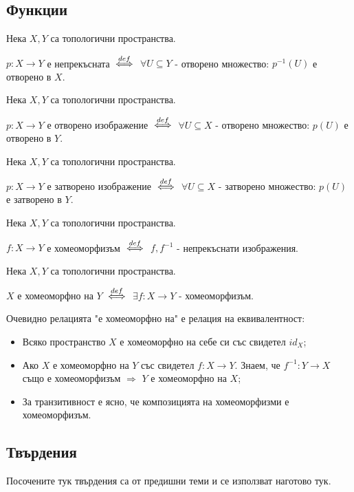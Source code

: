 \subsection{Функции}
\begin{definition}
    Нека $X, Y$ са топологични пространства.
    
    $p: X \to Y$ е непрекъсната ${\overset{def}{\iff}}$ $\forall U \subseteq Y$ - отворено множество: $p^{-1}(U)$ е отворено в $X$.
\end{definition}
\begin{definition}
    Нека $X, Y$ са топологични пространства.
    
    $p: X \to Y$ е отворено изображение ${\overset{def}{\iff}}$ $\forall U \subseteq X$ - отворено множество: $p(U)$ е отворено в $Y$.
\end{definition}
\begin{definition}
    Нека $X, Y$ са топологични пространства.
    
    $p: X \to Y$ е затворено изображение ${\overset{def}{\iff}}$ $\forall U \subseteq X$ - затворено множество: $p(U)$ е затворено в $Y$.
\end{definition}
\begin{definition}
    Нека $X, Y$ са топологични пространства.
    
    $f: X \to Y$ е хомеоморфизъм ${\overset{def}{\iff}}$ $f, f^{-1}$ - непрекъснати изображения.
\end{definition}
\begin{definition}
    Нека $X, Y$ са топологични пространства.
    
    $X$ е хомеоморфно на $Y$ ${\overset{def}{\iff}}$ $\exists f: X \to Y$ - хомеоморфизъм.
\end{definition}
\begin{fact}
    Очевидно релацията "е хомеоморфно на"  е релация на еквивалентност:
    \begin{itemize}
        \item Всяко пространство $X$ е хомеоморфно на себе си със свидетел $id_X$;
        \item Ако $X$ е хомеоморфно на $Y$ със свидетел $f: X \to Y$. Знаем, че $f^{-1}: Y \to X$ също е хомеоморфизъм $\Rightarrow$ $Y$ е хомеоморфно на $X$;
        \item За транзитивност е ясно, че композицията на хомеоморфизми е хомеоморфизъм.
    \end{itemize}
\end{fact}

\subsection{Твърдения}
Посочените тук твърдения са от предишни теми и се използват наготово тук.

